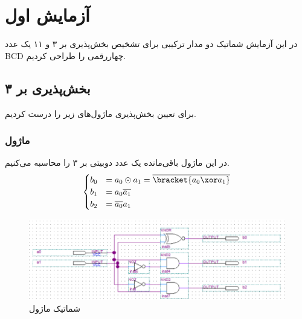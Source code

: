 \documentclass{perassignments}
\renewcommand{\maketitle}{\MakeMyLabTitle}
\begin{document}
	\maketitle
	\section{آزمایش اول}
	در این آزمایش شماتیک دو مدار ترکیبی برای تشخیص بخش‌پذیری بر ۳ و ۱۱ یک عدد 
	BCD
	چهاررقمی را طراحی کردیم.
	\subsection{بخش‌پذیری بر ۳}
	برای تعیین بخش‌پذیری ماژول‌های زیر را درست کردیم.
	\subsubsection{ماژول }
	در این ماژول باقی‌مانده یک عدد دوبیتی بر ۳ را محاسبه می‌کنیم.
	\begin{equation*}
		\begin{cases}
			b_0 &= a_0 \odot a_1 = \overline{\bracket{a_0 \xor a_1}}\\
			b_1 &= a_0 \overline{a_1}\\
			b_2 &= \overline{a_0} a_1
		\end{cases}
	\end{equation*}
	\begin{figure}[H]
		\centering
		\includegraphics[width = 0.8 \textwidth]{graphics/base3.png}
		\caption{شماتیک ماژول }
	\end{figure}
\end{document}

